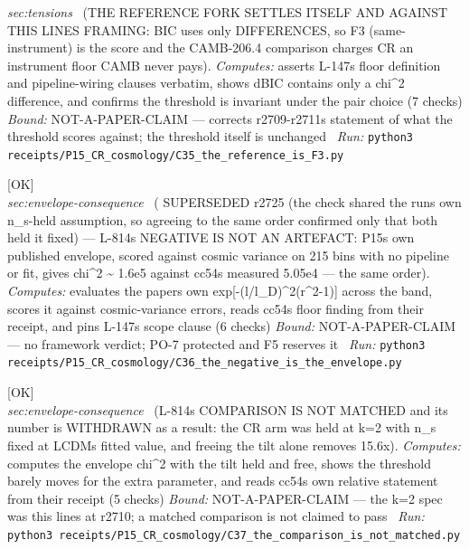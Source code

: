 \begin{description}
\textit{sec:tensions} \ (THE REFERENCE FORK SETTLES ITSELF AND AGAINST THIS LINES FRAMING: BIC uses only DIFFERENCES, so F3 (same-instrument) is the score and the CAMB-206.4 comparison charges CR an instrument floor CAMB never pays). 
\emph{Computes:} asserts L-147s floor definition and pipeline-wiring clauses verbatim, shows dBIC contains only a chi\textasciicircum{}2 difference, and confirms the threshold is invariant under the pair choice (7 checks)
 \emph{Bound:} NOT-A-PAPER-CLAIM --- corrects r2709-r2711s statement of what the threshold scores against; the threshold itself is unchanged
\ \emph{Run:} \texttt{python3 receipts/P15\_CR\_cosmology/C35\_the\_reference\_is\_F3.py}
\item[\rcptlabel{C36_the_negative_is_the_envelope}{P15R126}\textbf{P15R126}\quad\texttt{C36\_the\_negative\_is\_the\_envelope}]\hfill\textsf{[OK]}\\
\textit{sec:envelope-consequence} \ ( SUPERSEDED r2725 (the check shared the runs own n\_s-held assumption, so agreeing to the same order confirmed only that both held it fixed) --- L-814s NEGATIVE IS NOT AN ARTEFACT: P15s own published envelope, scored against cosmic variance on 215 bins with no pipeline or fit, gives chi\textasciicircum{}2 \textasciitilde{} 1.6e5 against cc54s measured 5.05e4 --- the same order). 
\emph{Computes:} evaluates the papers own exp[-(l/l\_D)\textasciicircum{}2(r\textasciicircum{}2-1)] across the band, scores it against cosmic-variance errors, reads cc54s floor finding from their receipt, and pins L-147s scope clause (6 checks)
 \emph{Bound:} NOT-A-PAPER-CLAIM --- no framework verdict; PO-7 protected and F5 reserves it
\ \emph{Run:} \texttt{python3 receipts/P15\_CR\_cosmology/C36\_the\_negative\_is\_the\_envelope.py}
\item[\rcptlabel{C37_the_comparison_is_not_matched}{P15R127}\textbf{P15R127}\quad\texttt{C37\_the\_comparison\_is\_not\_matched}]\hfill\textsf{[OK]}\\
\textit{sec:envelope-consequence} \ (L-814s COMPARISON IS NOT MATCHED and its number is WITHDRAWN as a result: the CR arm was held at k=2 with n\_s fixed at LCDMs fitted value, and freeing the tilt alone removes 15.6x). 
\emph{Computes:} computes the envelope chi\textasciicircum{}2 with the tilt held and free, shows the threshold barely moves for the extra parameter, and reads cc54s own relative statement from their receipt (5 checks)
 \emph{Bound:} NOT-A-PAPER-CLAIM --- the k=2 spec was this lines at r2710; a matched comparison is not claimed to pass
\ \emph{Run:} \texttt{python3 receipts/P15\_CR\_cosmology/C37\_the\_comparison\_is\_not\_matched.py}

\end{description}
